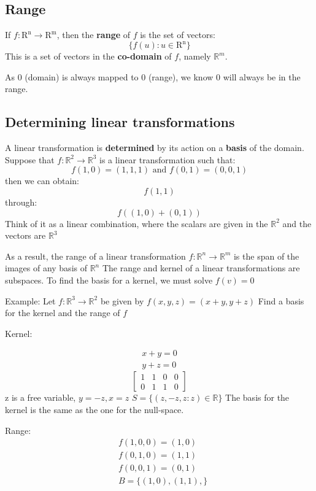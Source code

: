 \documentclass[11pt]{book}
\begin{document}
{{\subsection{Range}
\par{If $f:\mathrm{R^{n}}\to\mathrm{R^{m}}$, then the \textbf{range} of $f$ is the set of vectors:  \[
\lbrace f\left(u\right):u\in\mathrm{R^{n}}\rbrace
\] This is a set of vectors in the \textbf{co-domain} of $f$, namely $\mathbb{R}^{m}$.

As 0 (domain) is always mapped to 0 (range), we know 0 will always be in the range.
}
\subsection{Determining linear transformations}
\par{A linear transformation is \textbf{determined} by its action on a \textbf{basis} of the domain. Suppose that $f:\mathbb{R}^{2}\to \mathbb{R}^{3}$ is a linear transformation such that: \[
		f\left(1,0\right)=\left(1,1,1\right) \text{ and } f\left(0,1\right)=\left(0,0,1\right)
\] then we can obtain: \[
f\left(1,1\right)
\] through: \[
f\left(\left(1,0\right)+\left(0,1\right)\right)
\] Think of it as a linear combination, where the scalars are given in the $\mathbb{R}^{2}$ and the vectors are $\mathbb{R}^{3}$ 

As a result, the range of a linear transformation $f:\mathbb{R}^{n}\to\mathbb{R}^{m}$ is the span of the images of any basis of $\mathbb{R}^{n}$
The range and kernel of a linear transformations are subspaces.
To find the basis for a kernel, we must solve $f\left(v\right)=0$

Example: Let $f: \mathbb{R}^{3}\to \mathbb{R}^{2}$ be given by  $f\left(x,y,z\right)=\left(x+y,y+z\right)$ Find a basis for the kernel and the range of $f$

Kernel:
}
\begin{align*}
	x+y=0 \\
	y+z=0 
\end{align*}
\[\left[
	\begin{matrix}
	1 & 1 & 0 & 0 \\
	0 & 1 & 1 & 0
\end{matrix}\right]
\]
z is a free variable, $y=-z, x=z$
$S=\lbrace\left(z,-z,z:z\right)\in\mathbb{R}\rbrace$
The basis for the kernel is the same as the one for the null-space.

Range: 
\begin{align*}
	&f\left(1,0,0\right)=\left(1,0\right) \\
	&f\left(0,1,0\right)=\left(1,1\right) \\
	&f\left(0,0,1\right)=\left(0,1\right) \\
	&B=\lbrace\left(1,0\right),\left(1,1\right), \rbrace
\end{align*}
}}
\end{document}
